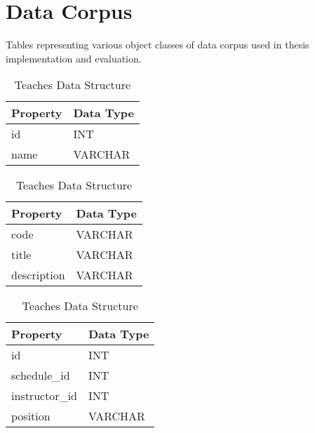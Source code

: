 \chapter{Data Corpus}
\label{chap:data-corpus-def}
	Tables representing various object classes of data corpus used in thesis implementation and evaluation.
	
	\begin{table}[H]
		\begin{subtable}[b]{.5\linewidth}
			\centering
			\begin{tabular}{ll}
				\toprule
				Property & Data Type \\
				\midrule
				id & INT \\
				name & VARCHAR \\
				\bottomrule
			\end{tabular}
			
			\caption{Instructor Data Structure}
			\label{tbl:corpus-instructor}
		\end{subtable}
		\begin{subtable}[b]{.5\linewidth}
			\centering
			\begin{tabular}{ll}
				\toprule
				Property & Data Type \\
				\midrule
				code & VARCHAR \\
				title & VARCHAR \\
				description & VARCHAR \\
				\bottomrule
			\end{tabular}
			
			\caption{Course Data Structure}
			\label{tbl:corpus-course}
		\end{subtable}
		\begin{subtable}[b]{.5\linewidth}
			\centering
			\begin{tabular}{ll}
				\toprule
				Property & Data Type \\
				\midrule
				id & INT \\
				schedule\_id & INT \\
				instructor\_id & INT \\
				position & VARCHAR \\
				\bottomrule
			\end{tabular}
			
			\caption{Teaches Data Structure}
			\label{tbl:corpus-teaches}
		\end{subtable}
	\end{table}
	
